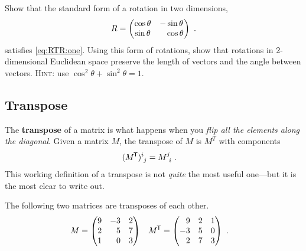 \begin{exercise}
Show that the standard form of a rotation in two dimensions,
\begin{align}
R=
    \begin{pmatrix}
    \cos \theta & -\sin\theta \\
    \sin \theta & \pp\cos\theta      
    \end{pmatrix} \ .
    \label{eq:2D:rotation:standard}
\end{align}
satisfies \eqref{eq:RTR:one}. Using this form of rotations, show that rotations in 2-dimensional Euclidean space preserve the length of vectors and the angle between vectors. \textsc{Hint}: use $\cos^2\theta + \sin^2\theta = 1$.
\end{exercise}

\begin{subappendices}
\section{Transpose}\label{sec:transpose}
The \textbf{transpose} of a matrix is what happens when you \emph{flip all the elements along the diagonal}. Given a matrix $M$, the transpose of $M$ is $M^T$ with components
\begin{align}
    (M^\trans)\aij{i}{j} &= M\aij{j}{i} \ .
    \label{eq:transpose:components}
\end{align}
This working definition of a transpose is not \emph{quite} the most useful one---but it is the most clear to write out.

\begin{example}
The following two matrices are transposes of each other.
\begin{align}
    M &= 
    \begin{pmatrix}
        9 & -3 & 2 \\
        2 & \pp 5 & 7 \\
        1 & \pp 0 & 3
    \end{pmatrix}
    &
    M^\trans &= 
    \begin{pmatrix}
        \pp 9 & 2 & 1 \\
        -3 & 5 & 0 \\
        \pp 2 & 7 & 3
    \end{pmatrix}
    \ .
\end{align}
\end{example}


\end{subappendices}
